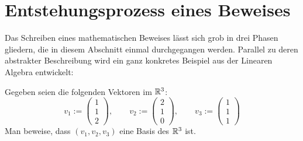 

\chapter{Entstehungsprozess eines Beweises} \label{anhang:entstehungsprozess}


Das Schreiben eines mathematischen Beweises lässt sich grob in drei Phasen gliedern, die in diesem Abschnitt einmal durchgegangen werden. Parallel zu deren abstrakter Beschreibung wird ein ganz konkretes Beispiel aus der Linearen Algebra entwickelt:


\begin{aufg}
    Gegeben seien die folgenden Vektoren im $\mathbb R^3$:
        \[ v_1:= \begin{pmatrix} 1 \\ 1 \\ 2 \end{pmatrix},\qquad  v_2:= \begin{pmatrix} 2 \\ 1 \\ 0 \end{pmatrix},\qquad v_3:= \begin{pmatrix} 1 \\ 1 \\ 1 \end{pmatrix}\]
    Man beweise, dass $(v_1,v_2,v_3)$ eine Basis des $\mathbb R^3$ ist.
\end{aufg}


